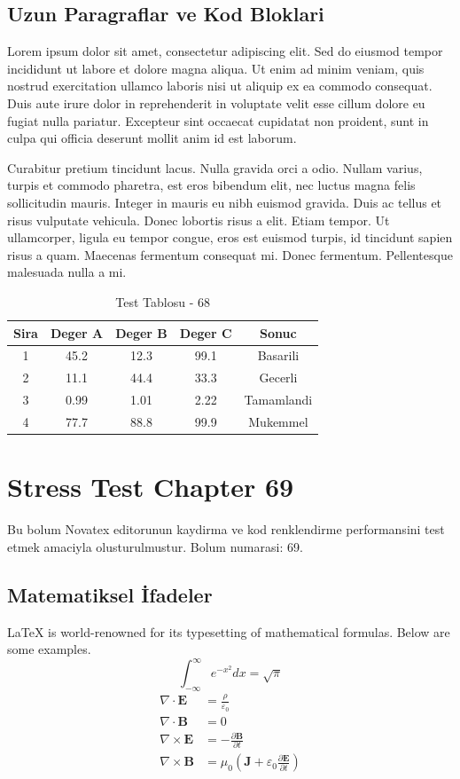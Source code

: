 \documentclass[12pt,a4paper]{article}
\begin{document}
\subsection{Uzun Paragraflar ve Kod Bloklari}
Lorem ipsum dolor sit amet, consectetur adipiscing elit. Sed do eiusmod tempor incididunt ut labore et dolore magna aliqua. Ut enim ad minim veniam, quis nostrud exercitation ullamco laboris nisi ut aliquip ex ea commodo consequat. Duis aute irure dolor in reprehenderit in voluptate velit esse cillum dolore eu fugiat nulla pariatur. Excepteur sint occaecat cupidatat non proident, sunt in culpa qui officia deserunt mollit anim id est laborum.

Curabitur pretium tincidunt lacus. Nulla gravida orci a odio. Nullam varius, turpis et commodo pharetra, est eros bibendum elit, nec luctus magna felis sollicitudin mauris. Integer in mauris eu nibh euismod gravida. Duis ac tellus et risus vulputate vehicula. Donec lobortis risus a elit. Etiam tempor. Ut ullamcorper, ligula eu tempor congue, eros est euismod turpis, id tincidunt sapien risus a quam. Maecenas fermentum consequat mi. Donec fermentum. Pellentesque malesuada nulla a mi.

\begin{table}[h!]
\centering
\begin{tabular}{|c|c|c|c|c|}
\hline
\textbf{Sira} & \textbf{Deger A} & \textbf{Deger B} & \textbf{Deger C} & \textbf{Sonuc} \\
\hline
1 & 45.2 & 12.3 & 99.1 & Basarili \\
2 & 11.1 & 44.4 & 33.3 & Gecerli \\
3 & 0.99 & 1.01 & 2.22 & Tamamlandi \\
4 & 77.7 & 88.8 & 99.9 & Mukemmel \\
\hline
\end{tabular}
\caption{Test Tablosu - 68}
\end{table}

\newpage
\section{Stress Test Chapter 69}
Bu bolum Novatex editorunun kaydirma ve kod renklendirme performansini test etmek amaciyla olusturulmustur. Bolum numarasi: 69.

\subsection{Matematiksel İfadeler}
\LaTeX{} is world-renowned for its typesetting of mathematical formulas. Below are some examples.
\begin{equation}
\int_{-\infty}^{\infty} e^{-x^2} dx = \sqrt{\pi}
\end{equation}
\begin{align}
\nabla \cdot \mathbf{E} &= \frac{\rho}{\varepsilon_0} \\
\nabla \cdot \mathbf{B} &= 0 \\
\nabla \times \mathbf{E} &= -\frac{\partial \mathbf{B}}{\partial t} \\
\nabla \times \mathbf{B} &= \mu_0\left(\mathbf{J} + \varepsilon_0 \frac{\partial \mathbf{E}}{\partial t}\right)
\end{align}
\end{document}
